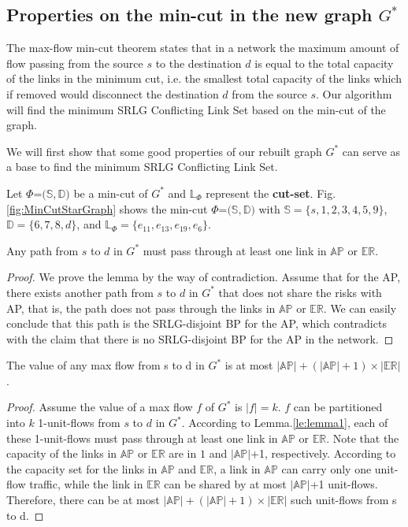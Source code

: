 \subsection{Properties on the min-cut in the new graph $G^*$}
\label{subsec:Properties on the min-cut in the new graph $G^*$}
The max-flow min-cut theorem states that in a  network the maximum amount of flow passing from the source $s$ to the destination $d$ is equal to the total capacity of the links in the minimum cut, i.e. the smallest total capacity of the links which if removed would disconnect the destination $d$ from the source $s$.  Our algorithm will find the minimum SRLG Conflicting Link Set based on the min-cut of the graph.

We will first show that some good properties of our rebuilt graph $G^*$ can serve as a base to find the minimum SRLG Conflicting Link Set.


Let $\Phi$=${(\mathbb{S}},{\mathbb{D}})$ be a min-cut of $G^*$ and $\mathbb{L}_{\Phi}$  represent the \textbf{cut-set}. Fig.\ref{fig:MinCutStarGraph} shows the min-cut $\Phi$=${(\mathbb{S}},{\mathbb{D}})$ with ${\mathbb{S}}=\{s, 1, 2, 3, 4, 5, 9\}$,  ${\mathbb{D}}=\{6, 7, 8, d\}$, and $\mathbb{L}_{\Phi}=\{e_{11}, e_{13}, e_{19}, e_6\}$.


\begin{lemma}
\label{le:lemma1}
    Any path from $s$ to $d$ in $G^*$ must pass through at least one link in $\mathbb{AP}$ or $\mathbb{\mathbb{ER}}$.
\end{lemma}
\begin{proof}
We prove the lemma by the way of contradiction. Assume that for the AP, there exists another path from  $s$ to $d$ in $G^*$ that does not share the risks with  AP, that is, the path does not pass through the links in $\mathbb{AP}$ or $\mathbb{\mathbb{ER}}$. We can easily conclude that this path is the SRLG-disjoint BP for the AP, which contradicts with the claim that there is no SRLG-disjoint BP for the AP in the network.
\end{proof}

\begin{lemma}
\label{le:lemma2}
    The value of any max flow from s to d in $G^*$ is at most $|\mathbb{AP}|+(|\mathbb{AP}|+1)\times|\mathbb{\mathbb{ER}}|$.
\end{lemma}
\begin{proof}
Assume the value of a max flow $f$ of $G^*$ is $|f|=k$. $f$ can be  partitioned into $k$ 1-unit-flows from $s$ to $d$ in  $G^*$.
According to Lemma.\ref{le:lemma1}, each of these 1-unit-flows must pass through at least one link in $\mathbb{AP}$ or $\mathbb{\mathbb{ER}}$.
 Note that the capacity of the links in  $\mathbb{AP}$ or $\mathbb{\mathbb{ER}}$ are in $1$ and $|\mathbb{AP}|$+1, respectively. According to the capacity set for the links in $\mathbb{AP}$ and $\mathbb{\mathbb{ER}}$, a link in $\mathbb{AP}$ can carry only one unit-flow traffic, while the  link in $\mathbb{ER}$ can be shared by at most  $|\mathbb{AP}|$+1 unit-flows.
 Therefore, there can be at most $|\mathbb{AP}|+ (|\mathbb{AP}|+1)\times|\mathbb{\mathbb{ER}}|$ such unit-flows from s to d.
\end{proof}

